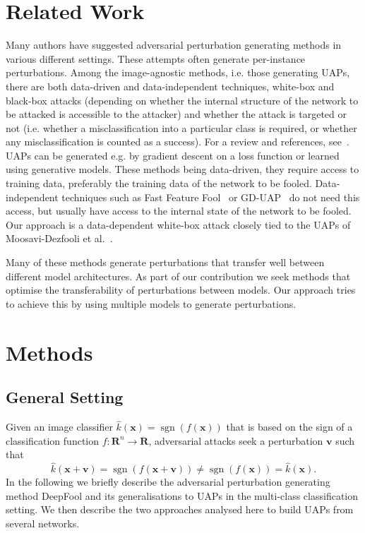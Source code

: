 \documentclass[runningheads]{llncs}
\DeclareMathOperator{\sgn}{sgn}
\newcommand{\xb}{\ensuremath{\mathbf{x}}}
\newcommand{\vb}{\ensuremath{\mathbf{v}}}
\begin{document}
\section{Related Work}\label{sec:relatedWork}
Many authors have suggested adversarial perturbation generating methods in various different settings. These attempts often generate per-instance perturbations. Among the image-agnostic methods, i.e. those generating UAPs, there are both data-driven and data-independent techniques, white-box and black-box attacks (depending on whether the internal structure of the network to be attacked is accessible to the attacker) and whether the attack is targeted or not (i.e. whether a misclassification into a particular class is required, or whether any misclassification is counted as a success). For a review and references, see~\cite{Chaubey2020UniversalAP}. UAPs can be generated e.g. by gradient descent on a loss function or learned using generative models. These methods being data-driven, they require access to training data, preferably the training data of the network to be fooled. Data-independent techniques such as Fast Feature Fool~\cite{Mopuri2017FastFF} or GD-UAP~\cite{DBLP:journals/corr/abs-1801-08092} do not need this access, but usually have access to the internal state of the network to be fooled. Our approach is a data-dependent white-box attack closely tied to the UAPs of Moosavi-Dezfooli et al.~\cite{moosavidezfooli_universal_2017}.

Many of these methods generate perturbations that transfer well between different model architectures. As part of our contribution we seek methods that optimise the transferability of perturbations between models. Our approach tries to achieve this by using multiple models to generate perturbations.

\section{Methods}\label{sec:methods}
\subsection{General Setting}
Given an image classifier \(\hat{k}(\xb)=\sgn\left(f(\xb)\right)\) that is based on the sign of a classification function \(f:\mathbf{R}^n\rightarrow\mathbf{R}\), adversarial attacks seek a perturbation \(\vb\) such that \[\hat{k}(\xb+\vb)=\sgn\left(f(\xb+\vb)\right)\neq \sgn\left(f(\xb)\right)=\hat{k}(\xb).\] 
In the following we briefly describe the adversarial perturbation generating method DeepFool and its generalisations to UAPs in the multi-class classification setting. We then describe the two approaches analysed here to build UAPs from several networks.
\end{document}
